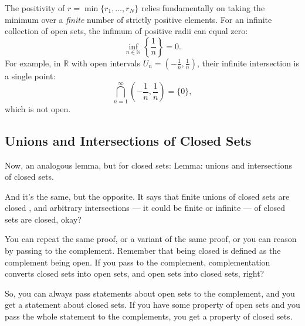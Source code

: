 \begin{proofWrapper}
\begin{content}
\begin{steps}
The positivity of $r = \min\{r_1, \dots, r_N\}$ relies fundamentally on taking the minimum over a \emph{finite} number of strictly positive elements. For an infinite collection of open sets, the infimum of positive radii can equal zero:
\[
\inf_{n \in \mathbb{N}} \left\{ \frac{1}{n} \right\} = 0.
\]
For example, in $\mathbb{R}$ with open intervals $U_n = \left(-\frac{1}{n}, \frac{1}{n}\right)$, their infinite intersection is a single point:
\[
\bigcap_{n=1}^\infty \left(-\frac{1}{n}, \frac{1}{n}\right) = \{0\},
\]
which is not open.
\end{steps}
\end{content}

\end{proofWrapper}

\subsection{Unions and Intersections of Closed Sets}

\begin{speech}[00:20:34 - 00:22:04]
Now, an analogous lemma, but for closed sets: Lemma: unions and intersections of closed sets. 

And it's the same, but the opposite. It says that finite unions of closed sets are closed , and arbitrary intersections --- it could be finite or infinite --- of closed sets are closed, okay? 

You can repeat the same proof, or a variant of the same proof, or you can reason by passing to the complement. Remember that being closed is defined as the complement being open. If you pass to the complement, complementation converts closed sets into open sets, and open sets into closed sets, right?

So, you can always pass statements about open sets to the complement, and you get a statement about closed sets. If you have some property of open sets and you pass the whole statement to the complements, you get a property of closed sets.
\end{speech}

